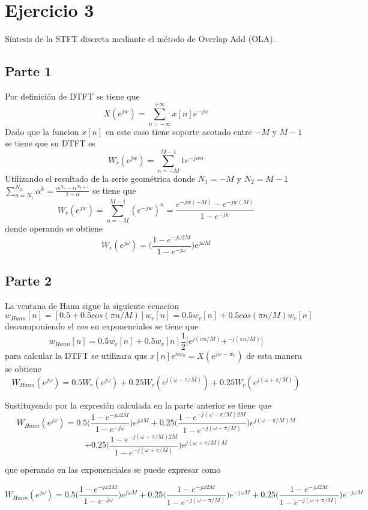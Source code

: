 \documentclass[a4paper]{article}
\begin{document}
\newpage
\section{Ejercicio 3}
Síntesis de la STFT discreta mediante el método de Overlap Add (OLA).
\subsection{Parte 1}
Por definición de DTFT se tiene que
$$X(e^{jw}) = \sum_{n=-\infty}^{+\infty}x[n]e^{-jw}$$
Dado que la funcion $x[n]$ en este caso tiene soporte acotado entre $-M$ y $M-1$ se tiene que su DTFT es
$$W_r(e^{jw}) = \sum_{n=-M}^{M-1}1e^{-jwn}$$
Utilizando el resultado de la serie geométrica donde $N_1 = -M$ y $N_2 = M-1$ $\sum_{n=N_1}^{N_2}\alpha^{k} = \frac{\alpha^{N_1}-\alpha^{N_2+1}}{1-\alpha}$
se tiene que
$$W_r(e^{jw}) = \sum_{n=-M}^{M-1}{(e^{-jw})}^n = \frac{e^{-jw(-M)}-e^{-jw(M)}}{1-e^{-jw}}$$
donde operando se obtiene 
$$    W_r(e^{j\omega}) = \bigg(\frac{1-e^{-j\omega 2M}}{1-e^{-j\omega}}\bigg)e^{j\omega M}$$
\subsection{Parte 2}
La ventana de Hann sigue la siguiente ecuacion
$$w_{Hann}[n]=[0.5 + 0.5cos(\pi n/M)]w_r[n] = 0.5w_r[n] + 0.5cos(\pi n/M)w_r[n]$$
descomponiendo el $cos$ en exponenciales se tiene que
$$w_{Hann}[n] = 0.5w_r[n] + 0.5w_r[n]\frac{1}{2}\big[e^{j(\pi n / M)}+^{-j(\pi n / M)}\big]$$
para calcular la DTFT se utilizara que $x[n]e^{nw_0}=X(e^{jw-w_0})$
de esta manera se obtiene
$$W_{Hann}(e^{j\omega}) = 0.5W_r(e^{j\omega}) +0.25 W_r(e^{j(\omega-\pi/M)})+0.25 W_r(e^{j(\omega+\pi/M)})$$

Sustituyendo por la expresión calculada en la parte anterior se tiene que
$$W_{Hann}(e^{j\omega}) = 0.5\bigg(\frac{1-e^{-j\omega 2M}}{1-e^{-j\omega}}\bigg)e^{j\omega M} + 0.25\bigg(\frac{1-e^{-j(\omega-\pi/M) 2M}}{1-e^{-j(\omega-\pi/M)}}\bigg)e^{j(\omega-\pi/M) M}$$
$$+0.25\bigg(\frac{1-e^{-j(\omega+\pi/M) 2M}}{1-e^{-j(\omega+\pi/M)}}\bigg)e^{j(\omega+\pi/M) M}$$

que operando en las exponenciales se puede expresar como

$$W_{Hann}(e^{j\omega}) = 0.5\bigg(\frac{1-e^{-j\omega 2M}}{1-e^{-j\omega}}\bigg)e^{j\omega M} +
0.25\bigg(\frac{1-e^{-j\omega2M}}{1-e^{-j(\omega-\pi/M)}}\bigg)e^{-j\omega M}+0.25\bigg(\frac{1-e^{-j\omega2M}}{1-e^{-j(\omega+\pi/M)}}\bigg)e^{-j\omega M}$$
\end{document}
